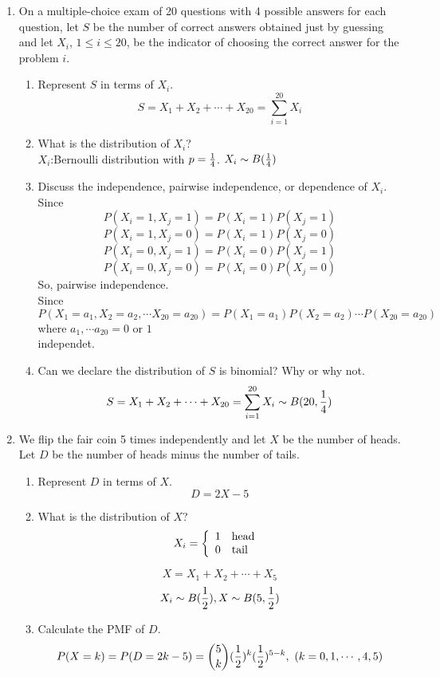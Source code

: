 \documentclass[12pt]{article}%
\newcommand{\0}{{\bf 0}}
\begin{document}
\begin{enumerate}
\item 
On a multiple-choice exam of 20 questions  with 4 possible answers for each question, 
let $S$ be the number of correct answers obtained just by guessing and
let $X_i$, $1\le i\le 20$, be the indicator of choosing the correct answer for the problem $i$.
\begin{enumerate}
\item Represent $S$ in terms of $X_i$.
\\
{\color{blue}{\bf Sol.}}
$$S=X_1+X_2+\cdots+X_{20}=\sum_{i=1}^{20}X_i$$
\item What is the distribution of $X_i$?
\\
{\color{blue}{\bf Sol.}}
$X_i$:Bernoulli distribution with $p=\f{1}{4}$. $X_i \sim B(\f{1}{4})$
\item Discuss the independence, pairwise independence, or dependence of $X_i$.
\\
{\color{blue}{\bf Sol.}}
Since
$$P(X_i=1,X_j=1)=P(X_i=1)P(X_j=1)$$
$$P(X_i=1,X_j=0)=P(X_i=1)P(X_j=0)$$
$$P(X_i=0,X_j=1)=P(X_i=0)P(X_j=1)$$
$$P(X_i=0,X_j=0)=P(X_i=0)P(X_j=0)$$
So, pairwise independence.\\
Since
$$P(X_1=a_1,X_2=a_2,\cdots X_{20}=a_{20})=P(X_1=a_1)P(X_2=a_2)\cdots P(X_{20}=a_{20})$$
where $a_1, \cdots a_{20}=0$ or $1$\\
independet.
\item Can we declare the distribution of $S$ is binomial? Why or why not.
\\
{\color{blue}{\bf Sol.}}
$$S=X_1+X_2+\cdots+X_{20}=\sum_{i=1}^{20}X_i  \sim  B(20,\f{1}{4}) $$
\end{enumerate}





\item 
We flip the fair coin 5 times independently and let $X$ be the number of heads.
Let $D$ be the number of heads minus the number of tails.
\begin{enumerate}
\item Represent $D$ in terms of $X$.
\\
{\color{blue}{\bf Sol.}}
$$D=2X-5 $$
\item What is the distribution of $X$?
\\
{\color{blue}{\bf Sol.}}
$$
X_i=\left\{\ba{ll}
1 &\mb{head}\ \\
0 &\mb{tail}\
\ea\right.
$$

$$X=X_1+X_2+\cdots +X_5$$
$$X_i \sim B(\f{1}{2}), X \sim B(5, \f{1}{2}) $$
\item Calculate the PMF of $D$.
\\
{\color{blue}{\bf Sol.}}
$$P(X=k)= P(D=2k-5)={5 \choose k}(\f{1}{2})^k(\f{1}{2})^{5-k},\ (k=0,1,\cdots ,4,5)$$


\end{enumerate}
\end{enumerate}
\end{document}
